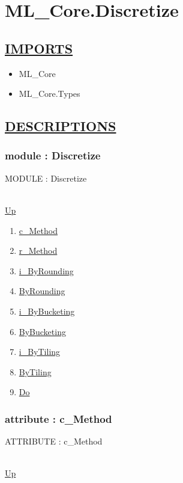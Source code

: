 \chapter*{ML\_Core.Discretize}
\hypertarget{ML_Core.Discretize}{}

\section*{\underline{IMPORTS}}
\begin{itemize}
\item ML\_Core
\item ML\_Core.Types
\end{itemize}

\section*{\underline{DESCRIPTIONS}}
\subsection*{module : Discretize}
\hypertarget{ecldoc:ML_Core.Discretize}{MODULE : Discretize} \\
\hyperlink{ecldoc:}{Up} \\
\par
\begin{enumerate}
\item \hyperlink{ecldoc:ecldoc-c_Method}{c\_Method}
\item \hyperlink{ecldoc:ml_core.discretize.r_method}{r\_Method}
\item \hyperlink{ecldoc:ml_core.discretize.i_byrounding}{i\_ByRounding}
\item \hyperlink{ecldoc:ml_core.discretize.byrounding}{ByRounding}
\item \hyperlink{ecldoc:ml_core.discretize.i_bybucketing}{i\_ByBucketing}
\item \hyperlink{ecldoc:ml_core.discretize.bybucketing}{ByBucketing}
\item \hyperlink{ecldoc:ml_core.discretize.i_bytiling}{i\_ByTiling}
\item \hyperlink{ecldoc:ml_core.discretize.bytiling}{ByTiling}
\item \hyperlink{ecldoc:ml_core.discretize.do}{Do}
\end{enumerate}
\subsection*{attribute : c\_Method}
\hypertarget{ecldoc:ecldoc-c_Method}{ATTRIBUTE : c\_Method} \\
\hyperlink{ecldoc:ML_Core.Discretize}{Up} \\
\par
